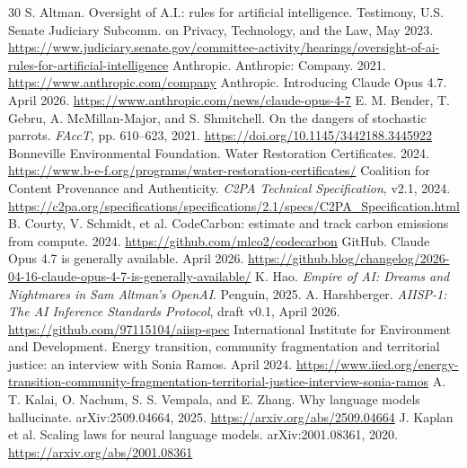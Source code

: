 \documentclass[10pt,a4paper,twocolumn]{article}
\renewcommand{\UrlFont}{\scriptsize\ttfamily}
\begin{document}
\onecolumn
\newpage
{}
{}
{\small
\setlength{\bibsep}{2pt plus 0.3pt}
\renewcommand{\UrlFont}{\small\ttfamily}
\begin{thebibliography}{30}
 S. Altman. Oversight of A.I.: rules for artificial intelligence. Testimony, U.S. Senate Judiciary Subcomm. on Privacy, Technology, and the Law, May 2023. \url{https://www.judiciary.senate.gov/committee-activity/hearings/oversight-of-ai-rules-for-artificial-intelligence}
 Anthropic. Anthropic: Company. 2021. \url{https://www.anthropic.com/company}
 Anthropic. Introducing Claude Opus 4.7. April 2026. \url{https://www.anthropic.com/news/claude-opus-4-7}
 E. M. Bender, T. Gebru, A. McMillan-Major, and S. Shmitchell. On the dangers of stochastic parrots. \emph{FAccT}, pp. 610--623, 2021. \url{https://doi.org/10.1145/3442188.3445922}
 Bonneville Environmental Foundation. Water Restoration Certificates. 2024. \url{https://www.b-e-f.org/programs/water-restoration-certificates/}
 Coalition for Content Provenance and Authenticity. \emph{C2PA Technical Specification}, v2.1, 2024. \url{https://c2pa.org/specifications/specifications/2.1/specs/C2PA_Specification.html}
 B. Courty, V. Schmidt, et al. CodeCarbon: estimate and track carbon emissions from compute. 2024. \url{https://github.com/mlco2/codecarbon}
 GitHub. Claude Opus 4.7 is generally available. April 2026. \url{https://github.blog/changelog/2026-04-16-claude-opus-4-7-is-generally-available/}
 K. Hao. \emph{Empire of AI: Dreams and Nightmares in Sam Altman's OpenAI}. Penguin, 2025.
 A. Harshberger. \emph{AIISP-1: The AI Inference Standards Protocol}, draft v0.1, April 2026. \url{https://github.com/97115104/aiisp-spec}
 International Institute for Environment and Development. Energy transition, community fragmentation and territorial justice: an interview with Sonia Ramos. April 2024. \url{https://www.iied.org/energy-transition-community-fragmentation-territorial-justice-interview-sonia-ramos}
 A. T. Kalai, O. Nachum, S. S. Vempala, and E. Zhang. Why language models hallucinate. arXiv:2509.04664, 2025. \url{https://arxiv.org/abs/2509.04664}
 J. Kaplan et al. Scaling laws for neural language models. arXiv:2001.08361, 2020. \url{https://arxiv.org/abs/2001.08361}

\end{thebibliography}}
\end{document}
